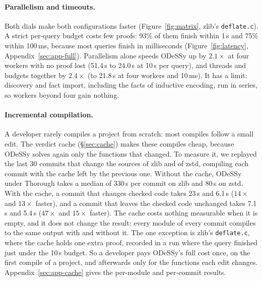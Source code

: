 \documentclass[acmsmall,screen,nonacm]{acmart}
\newcommand{\odessy}{ODeSSy}
\newcommand{\tool}{\odessy}
\newcommand{\pct}[1]{#1\%}
\begin{document}
\paragraph{Parallelism and timeouts.}
Both dials make both configurations faster (Figure~\ref{fig:matrix}, zlib's
\texttt{deflate.c}). A strict per-query budget costs few proofs: \pct{93}
of them finish within 1\,s and \pct{75} within 100\,ms, because most queries
finish in milliseconds (Figure~\ref{fig:latency},
Appendix~\ref{sec:app-full}). Parallelism alone speeds \tool{} up by
$2.1\times$ at four workers with no proof lost (51.4\,s to 24.0\,s at
10\,s per query), and threads and budgets together by $2.4\times$ (to
21.8\,s at four workers and 10\,ms). It has a limit: discovery and fact
import, including the facts of inductive encoding, run in series, so
workers beyond four gain nothing.

\paragraph{Incremental compilation.}
A developer rarely compiles a project from scratch: most compiles follow
a small edit. The verdict cache (\S\ref{sec:cache}) makes these compiles
cheap, because \tool{} solves again only the functions that changed. To
measure it, we replayed the last 30 commits that change the sources of
zlib and of zstd, compiling each commit with the cache left by the previous
one. Without the cache, \tool{} under Thorough takes a median of 330\,s
per commit on zlib and 80\,s on zstd. With the cache, a commit that changes
checked code takes 23\,s and 6.1\,s ($14\times$ and $13\times$ faster), and
a commit that leaves the checked code unchanged takes 7.1\,s and 5.4\,s
($47\times$ and $15\times$ faster). The cache costs nothing measurable
when it is empty, and it does not change the result: every module of every
commit compiles to the same output with and without it. The one exception
is zlib's \texttt{deflate.c}, where the cache holds one extra proof,
recorded in a run where the query finished just under the 10\,s budget. So
a developer pays \tool{}'s full cost once, on the first compile of a
project, and afterwards only for the functions each edit changes.
Appendix~\ref{sec:app-cache} gives the per-module and per-commit results.
\end{document}
